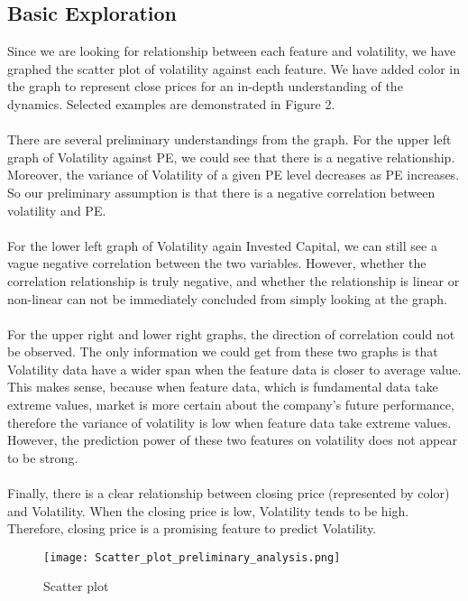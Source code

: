 \documentclass[b4paper]{article}
\begin{document}
\subsection{Basic Exploration}
Since we are looking for relationship between each feature and volatility, we have graphed the scatter plot of volatility against each feature. We have added color in the graph to represent close prices for an in-depth understanding of the dynamics. Selected examples are demonstrated in Figure 2.
\\\\There are several preliminary understandings from the graph. For the upper left graph of Volatility against PE, we could see that there is a negative relationship. Moreover, the variance of Volatility of a given PE level decreases as PE increases. So our preliminary assumption is that there is a negative correlation between volatility and PE. 
\\\\For the lower left graph of Volatility again Invested Capital, we can still see a vague negative correlation between the two variables. However, whether the correlation relationship is truly negative, and whether the relationship is linear or non-linear can not be immediately concluded from simply looking at the graph.
\\\\For the upper right and lower right graphs, the direction of correlation could not be observed. The only information we could get from these two graphs is that Volatility data have a wider span when the feature data is closer to average value. This makes sense, because when feature data, which is fundamental data take extreme values, market is more certain about the company's future performance, therefore the variance of volatility is low when feature data take extreme values. However, the prediction power of these two features on volatility does not appear to be strong.
\\\\Finally, there is a clear relationship between closing price (represented by color) and Volatility. When the closing price is low, Volatility tends to be high. Therefore, closing price is a promising feature to predict Volatility.

\begin{figure}
\centering
\texttt{[image: Scatter\_plot\_preliminary\_analysis.png]}
\caption{\label{fig:scatter plot}Scatter plot}
\end{figure}
\end{document}
